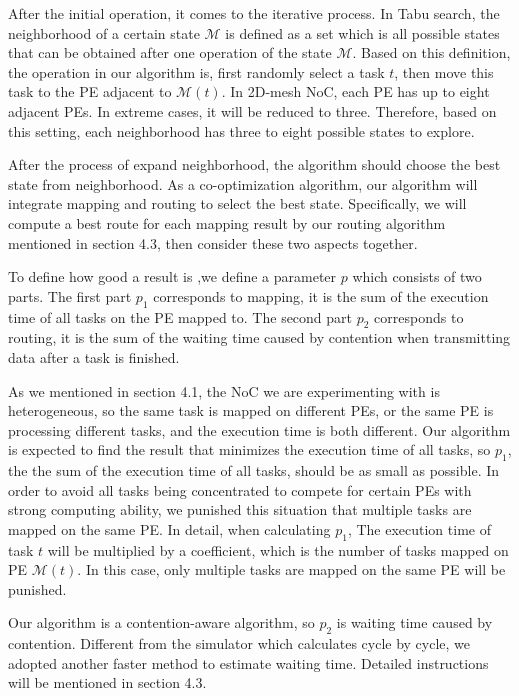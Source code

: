 After the initial operation, it comes to the iterative process. In Tabu search, the neighborhood of a certain state $\mathcal{M}$ is defined as a set which is  all possible states that can be obtained after one operation of the state $\mathcal{M}$. Based on this definition, the operation in our algorithm is, first randomly select a task $t$, then move this task to the PE adjacent to $\mathcal{M}(t)$.
In 2D-mesh NoC, each PE has up to eight adjacent PEs. In extreme cases, it will be reduced to three. Therefore, based on this setting, each neighborhood has three to eight possible states to explore.


After the process of expand neighborhood, the algorithm should choose the best state from neighborhood. As a co-optimization algorithm, our algorithm will integrate mapping and routing to select the best state. Specifically, we will compute a best route for each mapping result by our routing algorithm mentioned in section 4.3, then consider these two aspects together.

To define how good a result is ,we define a parameter $p$ which consists of two parts. The first part $p_1$ corresponds to mapping, it is the sum of the execution time of all tasks on the PE mapped to. The second part $p_2$ corresponds to routing, it is the sum of the waiting time caused by contention when transmitting data after a task is finished.

As we mentioned in section 4.1, the NoC we are experimenting with is heterogeneous, so the same task is mapped on different PEs, or the same PE is processing different tasks, and the execution time is both different. Our algorithm is expected to find the result that minimizes the execution time of all tasks, so $p_1$, the the sum of the execution time of all tasks, should be as small as possible. In order to avoid all tasks being concentrated to compete for certain PEs with strong computing ability, we punished this situation that multiple tasks are mapped on the same PE. In detail, when calculating $p_1$, The execution time of task $t$ will be multiplied by a coefficient, which is the number of tasks mapped on PE $\mathcal{M}(t)$. In this case, only multiple tasks are mapped on the same PE will be punished.

Our algorithm is a contention-aware algorithm, so $p_2$ is waiting time caused by contention. Different from the simulator which calculates cycle by cycle, we adopted another faster method to estimate waiting time. Detailed instructions will be mentioned in section 4.3.

